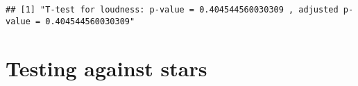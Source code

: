 \documentclass[
]{article}
\newenvironment{Shaded}{\begin{snugshade}}{\end{snugshade}}
\newcommand{\DecValTok}[1]{\textcolor[rgb]{0.00,0.00,0.81}{#1}}
\newcommand{\FunctionTok}[1]{\textcolor[rgb]{0.00,0.00,0.00}{#1}}
\newcommand{\NormalTok}[1]{#1}
\newcommand{\SpecialCharTok}[1]{\textcolor[rgb]{0.00,0.00,0.00}{#1}}
\newcommand{\StringTok}[1]{\textcolor[rgb]{0.31,0.60,0.02}{#1}}
\begin{document}
\begin{Shaded}
\end{Shaded}

\begin{verbatim}
## [1] "T-test for loudness: p-value = 0.404544560030309 , adjusted p-value = 0.404544560030309"
\end{verbatim}

\hypertarget{testing-against-stars}{%
\section{Testing against stars}\label{testing-against-stars}}
\end{document}
